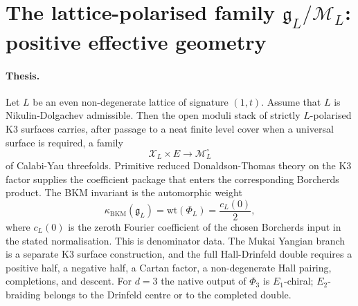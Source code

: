 
\providecommand{\Z}{\mathbb{Z}}
\providecommand{\C}{\mathbb{C}}
\providecommand{\bP}{\mathbb{P}}
\providecommand{\gfrak}{\mathfrak{g}}
\providecommand{\gL}{\mathfrak{g}_{L}}
\providecommand{\Pic}{\mathrm{Pic}}
\providecommand{\Om}{\Omega}
\providecommand{\wt}{\mathrm{wt}}
\providecommand{\rk}{\mathrm{rk}}
\providecommand{\Oneg}{\mathrm{O}^{+}}
\providecommand{\cM}{\mathcal{M}}
\providecommand{\cX}{\mathcal{X}}
\providecommand{\cO}{\mathcal{O}}
\providecommand{\LamK}{\Lambda_{K3}}
\providecommand{\Mred}{\mathcal{M}^{\mathrm{red}}}
\providecommand{\CoHA}{\mathrm{CoHA}}
\providecommand{\Rep}{\mathrm{Rep}}
\providecommand{\End}{\mathrm{End}}
\providecommand{\Perf}{\mathrm{Perf}}
\providecommand{\kBKM}{\kappa_{\mathrm{BKM}}}
\providecommand{\kch}{\kappa_{\mathrm{ch}}}
\providecommand{\kcat}{\kappa_{\mathrm{cat}}}
\providecommand{\kfib}{\kappa_{\mathrm{fiber}}}

\section*{The lattice-polarised family
  $\gL/\cM_{L}$: positive effective geometry}
\label{sec:gL-positive-geom-family}

\paragraph{Thesis.}
Let $L$ be an even non-degenerate lattice of signature $(1,t)$.
Assume that $L$ is Nikulin-Dolgachev admissible.  Then the open moduli
stack of strictly $L$-polarised K3 surfaces carries, after passage to a
neat finite level cover when a universal surface is required, a family
\[
  \cX_L\times E\longrightarrow \cM_L^\circ
\]
of Calabi-Yau threefolds.  Primitive reduced Donaldson-Thomas theory on
the K3 factor supplies the coefficient package that enters the
corresponding Borcherds product.  The BKM invariant is the automorphic
weight
\[
  \kBKM(\gL)=\wt(\Phi_L)=\frac{c_L(0)}{2},
\]
where $c_L(0)$ is the zeroth Fourier coefficient of the chosen
Borcherds input in the stated normalisation.  This is denominator data.
The Mukai Yangian branch is a separate K3 surface construction, and the
full Hall-Drinfeld double requires a positive half, a negative half, a
Cartan factor, a non-degenerate Hall pairing, completions, and descent.
For $d=3$ the native output of $\Phi_3$ is $E_1$-chiral; $E_2$-braiding
belongs to the Drinfeld centre or to the completed double.

